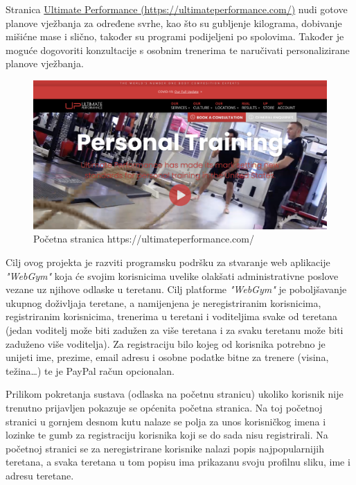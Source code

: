 		Stranica \href{https://ultimateperformance.com/}{Ultimate Performance (https://ultimateperformance.com/)} nudi gotove planove vježbanja za određene
		svrhe, kao što su gubljenje kilograma, dobivanje mišićne mase i slično, također 
		su programi podijeljeni po spolovima. Također je moguće dogovoriti konzultacije 
		s osobnim trenerima te naručivati personalizirane planove vježbanja.
		
		\begin{figure}[H]
			\includegraphics[scale=0.20]{slike/ultimateperformance.PNG} %
			\centering
			\caption{Početna stranica https://ultimateperformance.com/}
			\label{fig:promjene}
		\end{figure}
		
		\vspace{5mm}
		
		Cilj ovog projekta je razviti programsku podršku za stvaranje web aplikacije
		\textit{"WebGym"} koja će svojim korisnicima uvelike olakšati administrativne 
		poslove vezane uz njihove odlaske u teretanu. Cilj platforme \textit{"WebGym"} 
		je poboljšavanje ukupnog doživljaja teretane, a namijenjena je neregistriranim 
		korisnicima, registriranim korisnicima, trenerima u teretani i voditeljima svake od 
		teretana (jedan voditelj može biti zadužen za više
		teretana i za svaku teretanu može biti zaduženo više voditelja). Za registraciju bilo kojeg od korisnika potrebno je unijeti
		ime, prezime, email adresu i osobne podatke bitne za trenere (visina, težina…) te je PayPal račun opcionalan. 
		
		Prilikom pokretanja sustava (odlaska na početnu stranicu) ukoliko korisnik nije trenutno prijavljen pokazuje se općenita početna stranica. Na toj početnoj stranici u gornjem desnom kutu nalaze se polja za unos korisničkog imena i lozinke te gumb za registraciju korisnika koji se do sada nisu registrirali. Na početnoj stranici se za neregistrirane korisnike nalazi popis najpopularnijih teretana, a svaka teretana u tom popisu ima prikazanu svoju profilnu sliku, ime i adresu teretane.
		
